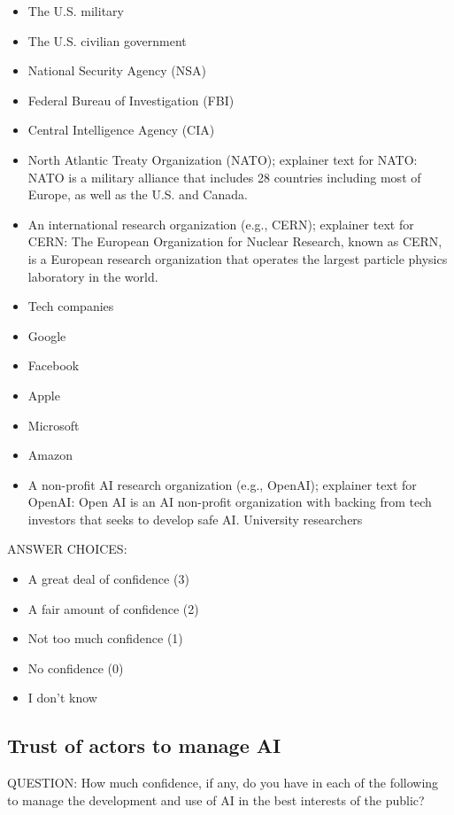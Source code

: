 \documentclass{article}
\begin{document}
\begin{itemize}
\item The U.S. military
\item The U.S. civilian government
\item National Security Agency (NSA)
\item Federal Bureau of Investigation (FBI)
\item Central Intelligence Agency (CIA)
\item North Atlantic Treaty Organization (NATO);  explainer text for NATO: NATO is a military alliance that includes 28 countries including most of Europe, as well as the U.S. and Canada.
\item An international research organization (e.g., CERN); explainer text for CERN: The European Organization for Nuclear Research, known as CERN, is a European research organization that operates the largest particle physics laboratory in the world.
\item Tech companies
\item Google
\item Facebook
\item Apple
\item Microsoft
\item Amazon
\item A non-profit AI research organization (e.g., OpenAI); explainer text for OpenAI: Open AI is an AI non-profit organization with backing from tech investors that seeks to develop safe AI. University researchers
\end{itemize}

\noindent ANSWER CHOICES:

\begin{itemize}
\item A great deal of confidence (3)
\item A fair amount of confidence (2)
\item Not too much confidence (1)
\item No confidence (0)
\item I don’t know
\end{itemize}

\subsection{Trust of actors to manage AI}

\noindent QUESTION: How much confidence, if any, do you have in each of the following to manage the development and use of AI in the best interests of the public?
\end{document}
